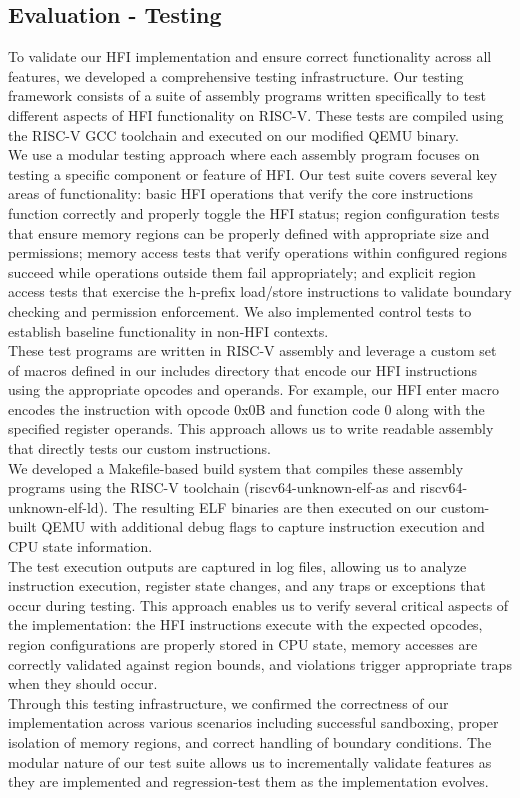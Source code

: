 \documentclass[conference,compsoc]{IEEEtran}
\begin{document}
\subsection{Evaluation - Testing}
To validate our HFI implementation and ensure correct functionality across all features, we developed a comprehensive testing infrastructure. Our testing framework consists of a suite of assembly programs written specifically to test different aspects of HFI functionality on RISC-V. These tests are compiled using the RISC-V GCC toolchain and executed on our modified QEMU binary.\\
We use a modular testing approach where each assembly program focuses on testing a specific component or feature of HFI. Our test suite covers several key areas of functionality: basic HFI operations that verify the core instructions function correctly and properly toggle the HFI status; region configuration tests that ensure memory regions can be properly defined with appropriate size and permissions; memory access tests that verify operations within configured regions succeed while operations outside them fail appropriately; and explicit region access tests that exercise the h-prefix load/store instructions to validate boundary checking and permission enforcement. We also implemented control tests to establish baseline functionality in non-HFI contexts.\\
These test programs are written in RISC-V assembly and leverage a custom set of macros defined in our includes directory that encode our HFI instructions using the appropriate opcodes and operands. For example, our HFI enter macro encodes the instruction with opcode 0x0B and function code 0 along with the specified register operands. This approach allows us to write readable assembly that directly tests our custom instructions.\\
We developed a Makefile-based build system that compiles these assembly programs using the RISC-V toolchain (riscv64-unknown-elf-as and riscv64-unknown-elf-ld). The resulting ELF binaries are then executed on our custom-built QEMU with additional debug flags to capture instruction execution and CPU state information.\\
The test execution outputs are captured in log files, allowing us to analyze instruction execution, register state changes, and any traps or exceptions that occur during testing. This approach enables us to verify several critical aspects of the implementation: the HFI instructions execute with the expected opcodes, region configurations are properly stored in CPU state, memory accesses are correctly validated against region bounds, and violations trigger appropriate traps when they should occur.\\
Through this testing infrastructure, we confirmed the correctness of our implementation across various scenarios including successful sandboxing, proper isolation of memory regions, and correct handling of boundary conditions. The modular nature of our test suite allows us to incrementally validate features as they are implemented and regression-test them as the implementation evolves.
\end{document}
